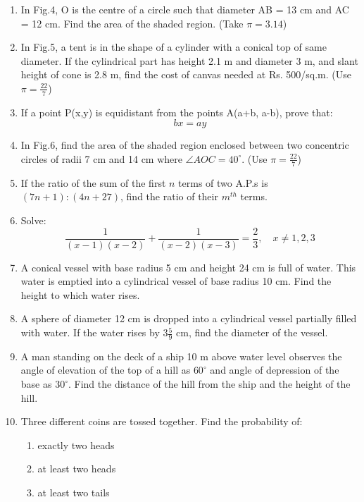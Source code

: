 \documentclass[12pt]{article}
\begin{document}
\begin{enumerate}[label=\arabic*.]
\begin{center}
{\fontsize{14pt}{16pt}\selectfont \textbf{SECTION - C}}\\[0.3cm]
\textbf{Question numbers 11 to 20 carry 3 marks each.}
\end{center}

\item In Fig.4, O is the centre of a circle such that diameter AB = 13 cm and AC = 12 cm. Find the area of the shaded region. (Take $\pi = 3.14$)

\item In Fig.5, a tent is in the shape of a cylinder with a conical top of same diameter. If the cylindrical part has height 2.1 m and diameter 3 m, and slant height of cone is 2.8 m, find the cost of canvas needed at Rs. 500/sq.m. (Use $\pi=\frac{22}{7}$)

\item If a point P(x,y) is equidistant from the points A(a+b, a-b), prove that:
\[
bx = ay
\]

\item In Fig.6, find the area of the shaded region enclosed between two concentric circles of radii 7 cm and 14 cm where $\angle AOC = 40^\circ$. (Use $\pi=\frac{22}{7}$)

\item If the ratio of the sum of the first $n$ terms of two A.P.s is $(7n+1):(4n+27)$, find the ratio of their $m^{th}$ terms.

\item Solve:
\[
\frac{1}{(x-1)(x-2)}+\frac{1}{(x-2)(x-3)}=\frac{2}{3}, \quad x\neq1,2,3
\]
\item A conical vessel with base radius 5 cm and height 24 cm is full of water. This water is emptied into a cylindrical vessel of base radius 10 cm. Find the height to which water rises.

\item A sphere of diameter 12 cm is dropped into a cylindrical vessel partially filled with water. If the water rises by $3\frac{5}{9}$ cm, find the diameter of the vessel.

\item A man standing on the deck of a ship 10 m above water level observes the angle of elevation of the top of a hill as $60^\circ$ and angle of depression of the base as $30^\circ$. Find the distance of the hill from the ship and the height of the hill.

\item Three different coins are tossed together. Find the probability of:
\begin{enumerate}
\item exactly two heads
\item at least two heads
\item at least two tails
\end{enumerate}


\end{enumerate}
\end{document}
